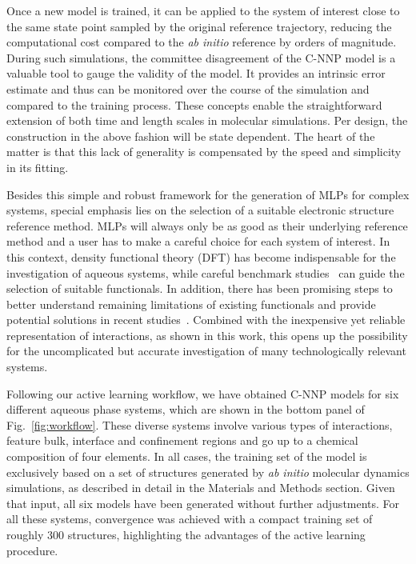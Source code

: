 \documentclass[aip,jcp,amsmath,amssymb,floatfix,reprint,citeautoscript,noeprint]{revtex4-1}
\begin{document}
\begin{bibunit}
%
Once a new model is trained, it can be applied to
the system of interest close to
%
the same state point sampled by the original reference trajectory, reducing
the computational cost compared
to the \textit{ab initio} reference by orders of magnitude.
%
During such simulations, the committee disagreement of
the C-NNP model is a valuable tool to gauge
the validity of the model.
%
It provides an intrinsic error estimate
and thus can be monitored over the course of
the simulation and compared to the training process.
%
These concepts enable
the straightforward extension of
both time and length scales in molecular simulations.
%
Per design, the construction in the above fashion will be state dependent.
%
The heart of the matter is that this lack of generality is compensated
by the speed and simplicity in its fitting.
%


Besides this simple and robust framework
for the generation of MLPs for complex systems, special emphasis lies
on the selection of a suitable electronic structure reference method.
%
MLPs will always only be as good as their underlying reference method and a user
has to make a careful choice for each system of interest.
%
In this context, density functional theory (DFT) has become indispensable for
the investigation of aqueous systems, while careful benchmark studies~\cite{Grossman2003/10.1063/1.1630560,
Distasio2014/10.1063/1.4893377,
Forster-Tonigold2014/10.1063/1.4892400,
Gillan2016/10.1063/1.4944633,
Chen2017/10.1073/pnas.1712499114,
Marsalek2017/10.1021/acs.jpclett.7b00391,
Brandenburg2019/10.1063/1.5121370,
Schienbein2020/10.1002/anie.202009640}
can guide the selection of suitable functionals.
%
In addition, there has been promising steps to better understand remaining
limitations of existing functionals and provide potential solutions
in recent studies~\cite{Sharkas2020/10.1073/pnas.1921258117,
Wagle2021/10.1063/5.0041620,
Duignan2021/10.1021/acs.accounts.1c00107}.
%
Combined with the inexpensive yet reliable representation of interactions, as shown
in this work, this opens up the possibility for the uncomplicated but accurate
investigation of many technologically relevant systems.



Following our active learning workflow, we have obtained
C-NNP models for six different aqueous phase systems,
which are shown in the bottom panel of Fig.~\ref{fig:workflow}.
%
These diverse systems involve various types of interactions,
feature bulk, interface and confinement regions and
go up to a chemical composition of four elements.
%
In all cases, the training set of the model is exclusively
based on a set of structures generated by \textit{ab initio}
molecular dynamics simulations, as described
in detail in the Materials and Methods section.
%
Given that input, all six models have been generated
without further adjustments.
%
For all these systems, convergence was achieved with a compact training set of
roughly 300 structures,
highlighting the advantages of the active learning procedure.


\end{bibunit}
\end{document}
